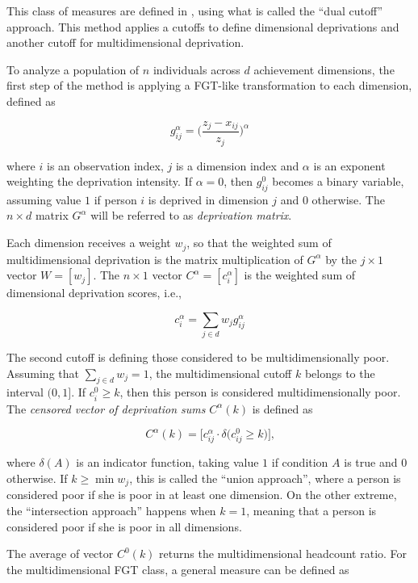 \documentclass[]{book}
\begin{document}
This class of measures are defined in \citet{alkire2011}, using what is called the ``dual cutoff'' approach. This method applies a cutoffs to define dimensional deprivations and another cutoff for multidimensional deprivation.

To analyze a population of \(n\) individuals across \(d\) achievement dimensions, the first step of the method is applying a FGT-like transformation to each dimension, defined as

\[
g_{ij}^\alpha = \bigg( \frac{ z_j - x_{ij} }{ z_j } \bigg)^{\alpha}
\]

where \(i\) is an observation index, \(j\) is a dimension index and \(\alpha\) is an exponent weighting the deprivation intensity. If \(\alpha=0\), then \(g_{ij}^0\) becomes a binary variable, assuming value \(1\) if person \(i\) is deprived in dimension \(j\) and \(0\) otherwise. The \(n \times d\) matrix \(G^\alpha\) will be referred to as \emph{deprivation matrix}.

Each dimension receives a weight \(w_j\), so that the weighted sum of multidimensional deprivation is the matrix multiplication of \(G^\alpha\) by the \(j \times 1\) vector \(W = [w_j]\). The \(n \times 1\) vector \(C^\alpha = [c^\alpha_i]\) is the weighted sum of dimensional deprivation scores, i.e.,

\[
c^\alpha_{i} = \sum_{j \in d} w_j g_{ij}^\alpha
\]

The second cutoff is defining those considered to be multidimensionally poor. Assuming that \(\sum_{j \in d} w_j = 1\), the multidimensional cutoff \(k\) belongs to the interval \((0,1]\). If \(c^0_{i} \geqslant k\), then this person is considered multidimensionally poor. The \emph{censored vector of deprivation sums} \(C^\alpha(k)\) is defined as

\[
C^\alpha (k) = \bigg[ c_{ij}^\alpha \cdot \delta \big( c_{ij}^0 \geqslant k \big) \bigg] \text{,}
\]

where \(\delta(A)\) is an indicator function, taking value \(1\) if condition \(A\) is true and \(0\) otherwise. If \(k \geqslant \min{ w_j }\), this is called the ``union approach'', where a person is considered poor if she is poor in at least one dimension. On the other extreme, the ``intersection approach'' happens when \(k = 1\), meaning that a person is considered poor if she is poor in all dimensions.

The average of vector \(C^0 (k)\) returns the multidimensional headcount ratio. For the multidimensional FGT class, a general measure can be defined as
\end{document}
